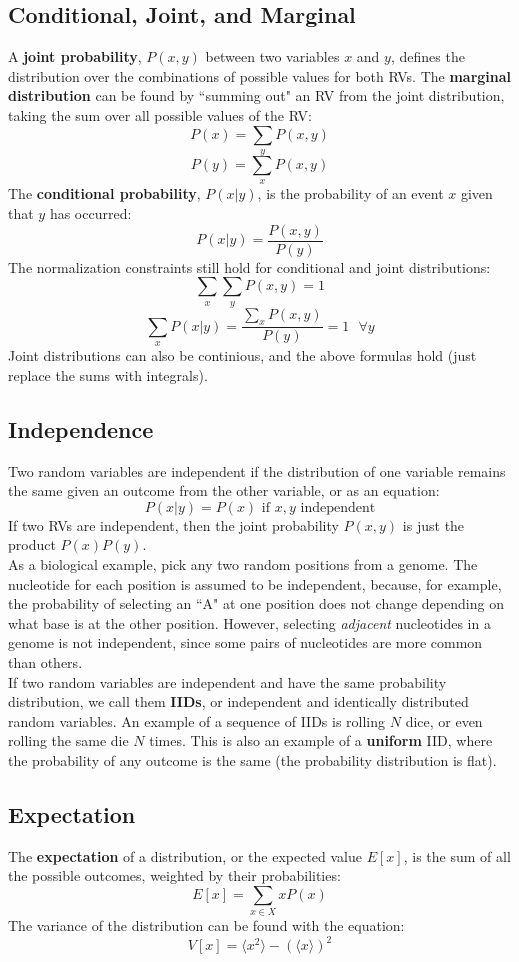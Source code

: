 \documentclass[12pt]{article}
\begin{document}
\subsection{Conditional, Joint, and Marginal}
A \textbf{joint probability}, $P(x, y)$ between two variables $x$ and $y$, defines the distribution over the combinations of possible values for both RVs. The \textbf{marginal distribution} can be found by ``summing out" an RV from the joint distribution, taking the sum over all possible values of the RV:
$$P(x) = \sum_yP(x,y)$$
$$P(y) = \sum_xP(x,y)$$
The \textbf{conditional probability}, $P(x|y)$, is the probability of an event $x$ given that $y$ has occurred:
$$P(x|y) = \frac{P(x,y)}{P(y)}$$
The normalization constraints still hold for conditional and joint distributions:
$$\sum_x\sum_yP(x,y) = 1$$
$$\sum_xP(x|y) = \frac{\sum_xP(x,y)}{P(y)} = 1\text{  }\forall y$$
Joint distributions can also be continious, and the above formulas hold (just replace the sums with integrals).
\subsection{Independence}
Two random variables are independent if the distribution of one variable remains the same given an outcome from the other variable, or as an equation:
$$P(x|y) = P(x) \text{ if }x,y\text{ independent}$$
If two RVs are independent, then the joint probability $P(x,y)$ is just the product $P(x)P(y)$.\\[10pt]
As a biological example, pick any two random positions from a genome. The nucleotide for each position is assumed to be independent, because, for example, the probability of selecting an ``A" at one position does not change depending on what base is at the other position. However, selecting \textit{adjacent} nucleotides in a genome is not independent, since some pairs of nucleotides are more common than others.\\[10pt]
If two random variables are independent and have the same probability distribution, we call them \textbf{IIDs}, or independent and identically distributed random variables. An example of a sequence of IIDs is rolling $N$ dice, or even rolling the same die $N$ times. This is also an example of a \textbf{uniform} IID, where the probability of any outcome is the same (the probability distribution is flat).
\subsection{Expectation}
The \textbf{expectation} of a distribution, or the expected value $E[x]$, is the sum of all the possible outcomes, weighted by their probabilities:
$$E[x] = \sum_{x\in X}xP(x)$$
The variance of the distribution can be found with the equation:
$$V[x] = \langle x^2\rangle-(\langle x\rangle)^2$$
\end{document}
